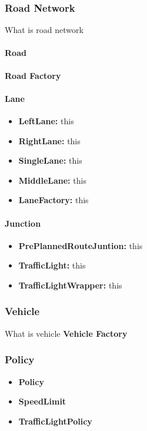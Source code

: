 \documentclass[11pt]{article}
\begin{document}
{\begin{itemize}
\subsubsection{Road Network}
What is road network
    \paragraph{Road}
    \textbf{Road Factory}\\
    \paragraph{Lane}
    \begin{itemize}[noitemsep]
    \item \textbf{LeftLane:} this  
    \item \textbf{RightLane:} this
    \item \textbf{SingleLane:} this
    \item \textbf{MiddleLane:} this  
    \item \textbf{LaneFactory:} this
    \end{itemize}
    \paragraph{Junction}
    \begin{itemize}[noitemsep]
    \item \textbf{PrePlannedRouteJuntion:} this  
    \item \textbf{TrafficLight:} this
    \item \textbf{TrafficLightWrapper:} this
    \end{itemize}
    
\subsubsection{Vehicle}
What is vehicle
\textbf{Vehicle Factory}\\


\subsubsection{Policy}        
\begin{itemize}[noitemsep]
\item \textbf{Policy} 
\item \textbf{SpeedLimit} 
\item \textbf{TrafficLightPolicy}
\end{itemize}


\end{itemize}}
\end{document}
